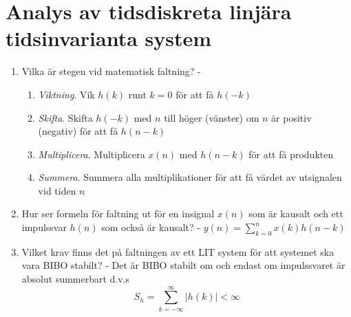 
\section{Analys av tidsdiskreta linjära tidsinvarianta system}
\begin{enumerate}
	\item Vilka är stegen vid matematisk faltning? - \begin{enumerate}
		\item \emph{Viktning}. Vik $h(k)$ runt $k=0$ för att få $h(-k)$
		\item \emph{Skifta}. Skifta $h(-k)$ med $n$ till höger (vänster) om $n$ är positiv (negativ) för att få $h(n-k)$
		\item \emph{Multiplicera}. Multiplicera $x(n)$ med $h(n-k)$ för att få produkten 
		\item \emph{Summera}. Summera alla multiplikationer för att få värdet av utsignalen vid tiden $n$
		\end{enumerate}
	\item Hur ser formeln för faltning ut för en insignal $x(n)$ som är kausalt och ett impulssvar $h(n)$ som också är kausalt? - $y(n)=\sum^n_{k=0}x(k)h(n-k)$
	\item Vilket krav finns det på faltningen av ett LIT system för att systemet ska vara BIBO stabilt? - Det är BIBO stabilt om och endast om impulssvaret är absolut summerbart d.v.s \[ S_h = \sum^\infty_{k=-\infty} |h(k)| < \infty \]
	\end{enumerate}

	
	

